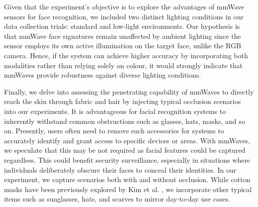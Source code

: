 \documentclass{mpaper}
\begin{document}
Given that the experiment's objective is to explore the advantages of mmWave sensors for face recognition, we included two distinct lighting conditions in our data collection trials: standard and low-light environments. Our hypothesis is that mmWave face signatures remain unaffected by ambient lighting since the sensor employs its own active illumination on the target face, unlike the RGB camera. Hence, if the system can achieve higher accuracy by incorporating both modalities rather than relying solely on colour, it would strongly indicate that mmWaves provide robustness against diverse lighting conditions.

Finally, we delve into assessing the penetrating capability of mmWaves to directly reach the skin through fabric and hair by injecting typical occlusion scenarios into our experiments. It is advantageous for facial recognition systems to inherently withstand common obstructions such as glasses, hats, masks, and so on. Presently, users often need to remove such accessories for systems to accurately identify and grant access to specific devices or areas. With mmWaves, we speculate that this may be not required as facial features could be captured regardless. This could benefit security surveillance, especially in situations where individuals deliberately obscure their faces to conceal their identities. In our experiment, we capture scenarios both with and without occlusion. While cotton masks have been previously explored by Kim et al. \cite{kim2020face}, we incorporate other typical items such as sunglasses, hats, and scarves to mirror day-to-day use cases.
\end{document}
